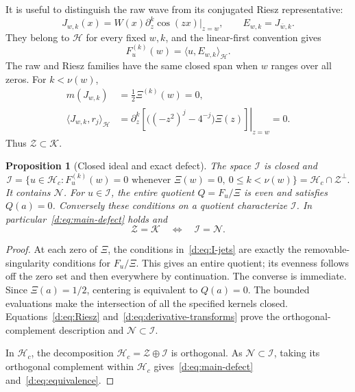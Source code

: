 \documentclass[11pt,a4paper]{article}
\numberwithin{equation}{section}
\newtheorem{proposition}[theorem]{Proposition}
\theoremstyle{definition}\newtheorem{definition}[theorem]{Definition}
\theoremstyle{remark}\newtheorem{remark}[theorem]{Remark}
\newcommand{\Hh}{\mathcal H}\newcommand{\Hw}{\mathcal H}
\newcommand{\ip}[2]{\langle#1,#2\rangle}\newcommand{\norm}[1]{\lVert#1\rVert}\newcommand{\abs}[1]{\lvert#1\rvert}
\newcommand{\Nn}{\mathcal N}\newcommand{\Ii}{\mathcal I}\newcommand{\Zz}{\mathcal Z}
\newcommand{\Kk}{\mathcal K}\newcommand{\Aa}{\mathcal A}\newcommand{\Ff}{\mathcal F}
\begin{document}
It is useful to distinguish the raw wave from its conjugated Riesz representative:
\begin{equation}\label{d:eq:waves}
 J_{w,k}(x)=W(x)\partial_z^k\cos(zx)|_{z=w},\qquad
 E_{w,k}=J_{\overline w,k}.
\end{equation}
They belong to $\Hh$ for every fixed $w,k$, and the linear-first convention gives
\begin{equation}\label{d:eq:Riesz}
 F_u^{(k)}(w)=\ip{u}{E_{w,k}}_{\Hh}.
\end{equation}
The raw and Riesz families have the same closed span when $w$ ranges over all zeros. For $k<\nu(w)$,
\begin{align}
 m(J_{w,k})&=\tfrac12\Xi^{(k)}(w)=0,\label{d:eq:wave-center}\\
 \ip{J_{w,k}}{r_j}_{\Hh}
 &=\left.\partial_z^k\left[\bigl((-z^2)^j-4^{-j}\bigr)\Xi(z)\right]\right|_{z=w}=0.
 \label{d:eq:wave-radical}
\end{align}
Thus $\Zz\subset\Kk$.

\begin{proposition}[Closed ideal and exact defect]\label{d:prop:ideal}
The space $\Ii$ is closed and
\begin{equation}\label{d:eq:I-jets}
 \Ii=\{u\in\Hh_c:F_u^{(k)}(w)=0\text{ whenever }\Xi(w)=0,\ 0\le k<\nu(w)\}
 =\Hh_c\cap\Zz^\perp.
\end{equation}
It contains $\Nn$. For $u\in\Ii$, the entire quotient $Q=F_u/\Xi$ is even and satisfies $Q(a)=0$. Conversely these conditions on a quotient characterize $\Ii$. In particular~\eqref{d:eq:main-defect} holds and
\begin{equation}\label{d:eq:equivalence}
 \Zz=\Kk\quad\Longleftrightarrow\quad\Ii=\Nn.
\end{equation}
\end{proposition}
\begin{proof}
At each zero of $\Xi$, the conditions in~\eqref{d:eq:I-jets} are exactly the removable-singularity conditions for $F_u/\Xi$. This gives an entire quotient; its evenness follows off the zero set and then everywhere by continuation. The converse is immediate. Since $\Xi(a)=1/2$, centering is equivalent to $Q(a)=0$. The bounded evaluations make the intersection of all the specified kernels closed. Equations~\eqref{d:eq:Riesz} and~\eqref{d:eq:derivative-transforms} prove the orthogonal-complement description and $\Nn\subset\Ii$.

In $\Hh_c$, the decomposition $\Hh_c=\Zz\oplus\Ii$ is orthogonal. As $\Nn\subset\Ii$, taking its orthogonal complement within $\Hh_c$ gives~\eqref{d:eq:main-defect} and~\eqref{d:eq:equivalence}.
\end{proof}
\end{document}
